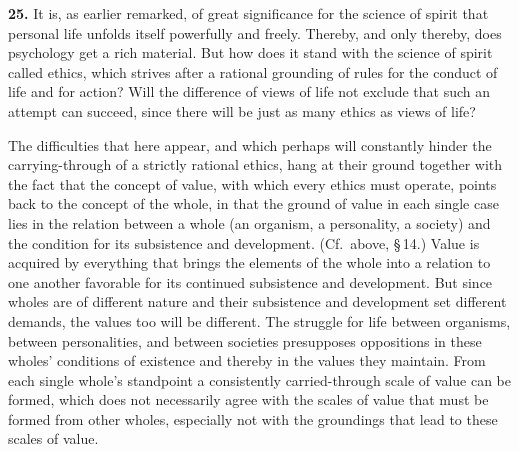 \documentclass[12pt]{book}
\newcommand{\hnum}[1]{\textbf{#1.}\enspace}
\newcommand{\opage}[1]{\marginnote{\footnotesize\textit{[#1]}}}
\begin{document}
\hnum{25} It is, as earlier remarked, of great significance for the science of spirit that personal life unfolds
itself powerfully and freely. Thereby, and only thereby, does psychology get a rich material. But how does it stand
with the science of spirit called ethics, which strives after a rational grounding of rules for the conduct of life and
for action? Will the difference of views of life not exclude that such an attempt can succeed, since there will be just
as many ethics as views of life?

The difficulties that here appear, and which perhaps will constantly hinder the carrying-through of a strictly rational
ethics, hang at their ground together with the fact that the concept of value, with which every ethics must operate,
points back to the concept of the whole, in that the ground of value in each single case lies in the relation between
a whole (an organism, a personality, a society) and the condition for its subsistence and development. (Cf.\ above,
\S\,14.) Value is acquired by everything that brings the elements of the whole into a relation to one another favorable
for its continued subsistence and development. But since wholes are of different nature and their subsistence and
development set different demands, the values too will be different. The struggle for life between organisms, between
personalities, and between societies presupposes oppositions in these wholes' conditions of existence and thereby in
the values they maintain. From each single whole's standpoint a consistently carried-through scale of value can be
formed, which does not necessarily agree with the scales of value that must be formed from other wholes, especially \opage{78}not
with the groundings that lead to these scales of value.
\end{document}
